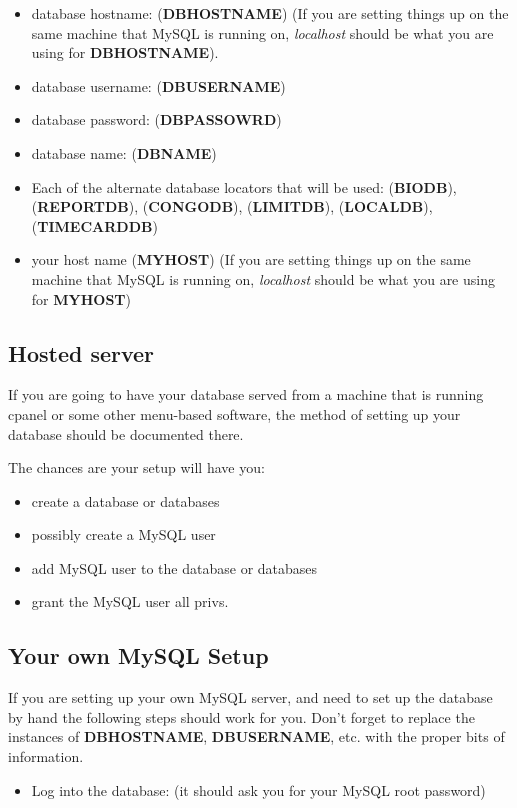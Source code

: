 \documentclass[tablesignature]{scrartcl}
\begin{document}
\begin{itemize}
\item database hostname: (\textbf{DBHOSTNAME}) (If you are setting things up on
    the same machine that MySQL is running on, \emph{localhost} should be
    what you are using for \textbf{DBHOSTNAME}).
\item database username: (\textbf{DBUSERNAME})
\item database password: (\textbf{DBPASSOWRD})
\item database name: (\textbf{DBNAME})
\item Each of the alternate database locators that will be used:
    (\textbf{BIODB}), (\textbf{REPORTDB}), (\textbf{CONGODB}), (\textbf{LIMITDB}), (\textbf{LOCALDB}),
    (\textbf{TIMECARDDB})
\item your host name (\textbf{MYHOST}) (If you are setting things up on the
    same machine that MySQL is running on, \emph{localhost} should be what
    you are using for \textbf{MYHOST})
\end{itemize}
\subsection{Hosted server}
\label{sec-4_1}

  If you are going to have your database served from a machine that
  is running cpanel or some other menu-based software, the method of
  setting up your database should be documented there.

  The chances are your setup will have you:
\begin{itemize}
\item create a database or databases
\item possibly create a MySQL user
\item add MySQL user to the database or databases
\item grant the MySQL user all privs.
\end{itemize}
\subsection{Your own MySQL Setup}
\label{sec-4_2}

   If you are setting up your own MySQL server, and need to set up the
   database by hand the following steps should work for you.  Don't
   forget to replace the instances of \textbf{DBHOSTNAME}, \textbf{DBUSERNAME},
   etc. with the proper bits of information.

\begin{itemize}
\item Log into the database: (it should ask you for your MySQL root password)
\end{itemize}
\end{document}
